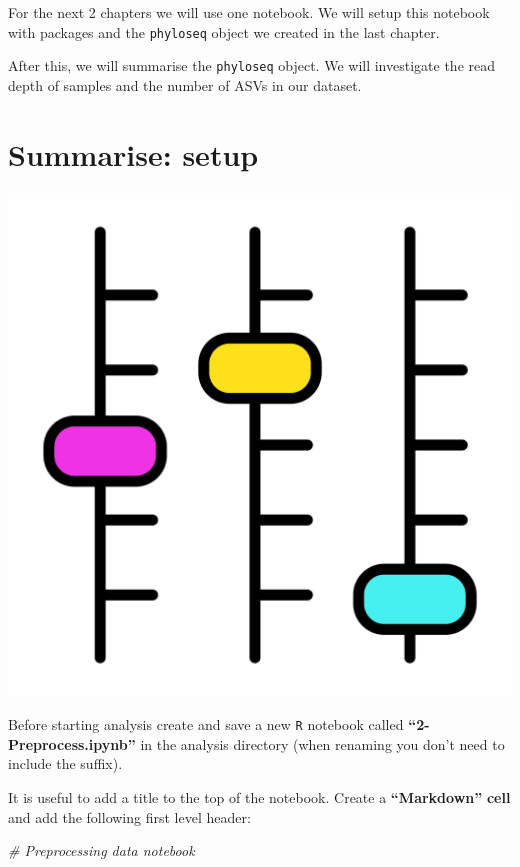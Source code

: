 \documentclass[
]{book}
\newenvironment{Shaded}{\begin{snugshade}}{\end{snugshade}}
\newcommand{\CommentTok}[1]{\textcolor[rgb]{0.56,0.35,0.01}{\textit{#1}}}
\begin{document}
For the next 2 chapters we will use one notebook. We will setup this notebook with packages and the \texttt{phyloseq} object we created in the last chapter.

After this, we will summarise the \texttt{phyloseq} object. We will investigate the read depth of samples and the number of ASVs in our dataset.

\hypertarget{summarise-setup}{%
\section{Summarise: setup}\label{summarise-setup}}

\includegraphics{figures/setup_2.png}

Before starting analysis create and save a new \texttt{R} notebook called \textbf{``2-Preprocess.ipynb''} in the analysis directory (when renaming you don't need to include the suffix).

It is useful to add a title to the top of the notebook.
Create a \textbf{``Markdown''} \textbf{cell} and add the following first level header:

\begin{Shaded}
\begin{Highlighting}[]
\CommentTok{\# Preprocessing data notebook}
\end{Highlighting}
\end{Shaded}
\end{document}
